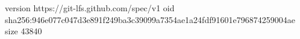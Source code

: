 version https://git-lfs.github.com/spec/v1
oid sha256:946e077c047d3e891f249ba3c39099a7354ae1a24fdf91601e796874259004ae
size 43840
